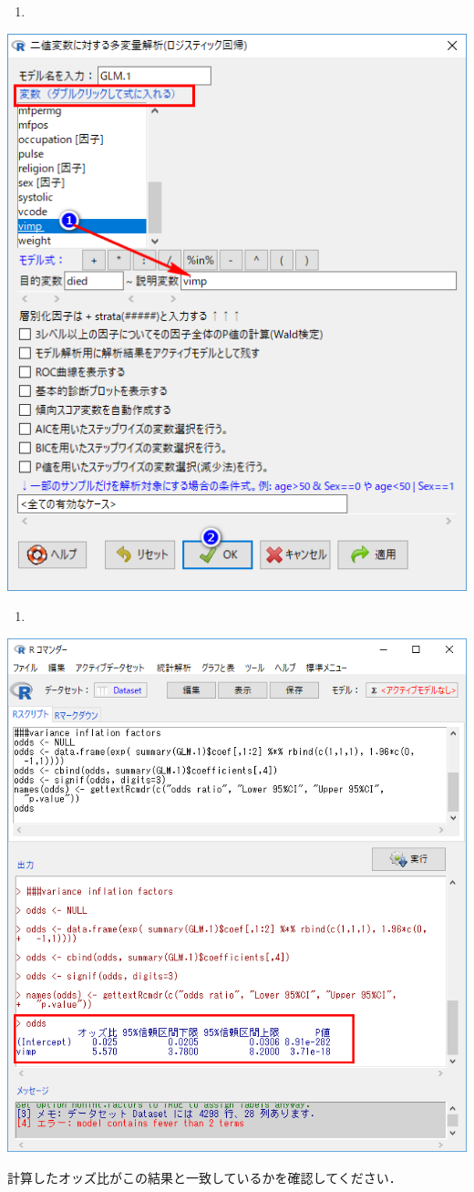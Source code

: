\documentclass[11pt,]{problemset}
\begin{document}
\begin{enumerate}
\def\labelenumi{\arabic{enumi}.}
\setcounter{enumi}{7}
\item
\end{enumerate}

\begin{center}\includegraphics[width=0.5\linewidth]{pic/logstic07} \end{center}

\newpage
\vfill

\begin{enumerate}
\def\labelenumi{\arabic{enumi}.}
\setcounter{enumi}{8}
\item
\end{enumerate}

\begin{center}\includegraphics[width=0.55\linewidth]{pic/logstic08} \end{center}

計算したオッズ比がこの結果と一致しているかを確認してください．
\end{document}
